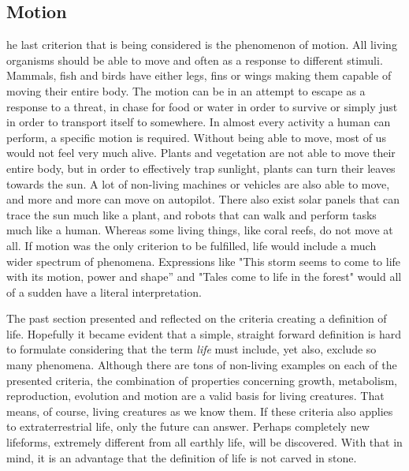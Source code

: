 \subsection{Motion}
he last criterion that is being considered is the phenomenon of motion.
All living organisms should be able to move and often as a response to different stimuli.
Mammals, fish and birds have either legs, fins or wings making them capable of moving their entire body.
The motion can be in an attempt to escape as a response to a threat, in chase for food or water in order to survive or simply just in order to transport itself to somewhere.
In almost every activity a human can perform, a specific motion is required.
Without being able to move, most of us would not feel very much alive.
Plants and vegetation are not able to move their entire body, but in order to effectively trap sunlight, plants can turn their leaves towards the sun.
A lot of non-living machines or vehicles are also able to move, and more and more can move on autopilot.
There also exist solar panels that can trace the sun much like a plant, and robots that can walk and perform tasks much like a human.
Whereas some living things, like coral reefs, do not move at all.
If motion was the only criterion to be fulfilled, life would include a much wider spectrum of phenomena.
Expressions like "This storm seems to come to life with its motion, power and shape'' and "Tales come to life in the forest" would all of a sudden have a literal interpretation. 

The past section presented and reflected on the criteria creating a definition of life.
Hopefully it became evident that a simple, straight forward definition is hard to formulate considering that the term \textit{life} must include, yet also, exclude so many phenomena.
Although there are tons of non-living examples on each of the presented criteria, the combination of properties concerning growth, metabolism, reproduction, evolution and motion are a valid basis for living creatures.
That means, of course, living creatures as we know them.
If these criteria also applies to extraterrestrial life, only the future can answer.
Perhaps completely new lifeforms, extremely different from all earthly life, will be discovered.
With that in mind, it is an advantage that the definition of life is not carved in stone.